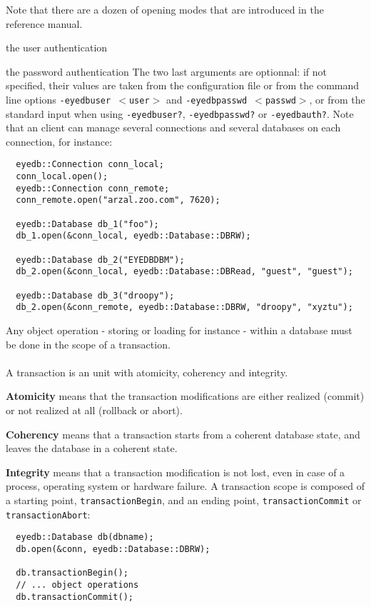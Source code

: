 Note that there are a dozen of opening modes that are introduced in
the reference manual.
\item the user authentication
\item the password authentication
\ee
The two last arguments are optionnal: if not specified, their values
are taken from the configuration file or from the command line options
\texttt{-eyedbuser $<$user$>$} and \texttt{-eyedbpasswd $<$passwd$>$}, or from
the standard input when using \texttt{-eyedbuser?}, \texttt{-eyedbpasswd?} or
\texttt{-eyedbauth?}.
\ee
Note that an \eyedb client can manage several connections and
several databases on each connection, for instance:
\verbsize
\begin{verbatim}
  eyedb::Connection conn_local;
  conn_local.open();
  eyedb::Connection conn_remote;
  conn_remote.open("arzal.zoo.com", 7620);

  eyedb::Database db_1("foo");
  db_1.open(&conn_local, eyedb::Database::DBRW);

  eyedb::Database db_2("EYEDBDBM");
  db_2.open(&conn_local, eyedb::Database::DBRead, "guest", "guest");

  eyedb::Database db_3("droopy");
  db_2.open(&conn_remote, eyedb::Database::DBRW, "droopy", "xyztu");
\end{verbatim}
\normalsize
{}
Any object operation - storing or loading for instance -
within a database must be done in the scope of a transaction.
\\
\\
A transaction is an unit with atomicity, coherency and integrity.
\be
\item {\bf Atomicity} means that the transaction modifications are either
realized (commit) or not realized at all (rollback or abort).
\item {\bf Coherency} means that a transaction starts from a coherent database
state, and leaves the database in a coherent state.
\item {\bf Integrity} means that a transaction modification is not lost, even
in case of a process, operating system or hardware failure.
\ee
A transaction scope is composed of a starting point, \texttt{transactionBegin},
and an ending point, \texttt{transactionCommit} or \texttt{transactionAbort}:
\verbsize
\begin{verbatim}
  eyedb::Database db(dbname);
  db.open(&conn, eyedb::Database::DBRW);

  db.transactionBegin();
  // ... object operations
  db.transactionCommit();
\end{verbatim}
